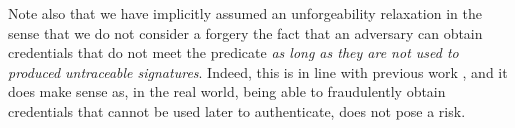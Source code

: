 Note also that we have implicitly assumed an unforgeability relaxation in the
sense that we do not consider a forgery the fact that an adversary can obtain
credentials that do not meet the \fissue predicate \emph{as long as they are
  not used to produced untraceable signatures}. Indeed, this is in line with
previous work \cite[Section 3.3.3]{ckl+15}, and it does make sense as, in the
real world, being able to fraudulently obtain credentials that cannot be used
later to authenticate, does not pose a risk.




